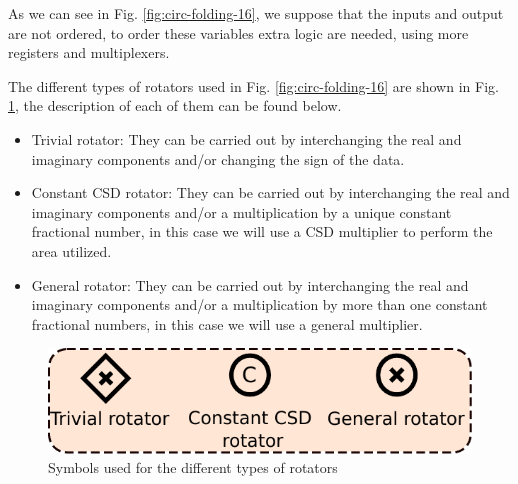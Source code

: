 \documentclass[journal,comsoc]{IEEEtran}
\begin{document}
As we can see in Fig. \ref{fig:circ-folding-16}, we suppose that the inputs and output are not ordered, to order these variables extra logic are needed, using more registers and multiplexers.

The different types of rotators used in Fig. \ref{fig:circ-folding-16} are shown in Fig. \ref{fig:rotators}, the description of each of them can be found below.
\begin{itemize}
	\item Trivial rotator: They can be carried out by interchanging the real and imaginary components and/or changing the sign of the data.
	\item Constant CSD rotator: They can be carried out by interchanging the real and imaginary components and/or a multiplication by a unique constant fractional number, in this case we will use a CSD multiplier to perform the area utilized.
	\item General rotator: They can be carried out by interchanging the real and imaginary components and/or a multiplication by more than one constant fractional numbers, in this case we will use a general multiplier.
\end{itemize}
\begin{figure}[h!]
	\centering
	\includegraphics[width=0.6\linewidth]{Diagramas/miSeccionFiguras/Rotadores.pdf}
	\caption{Symbols used for the different types of rotators}
	\label{fig:rotators}
\end{figure}



\end{document}
